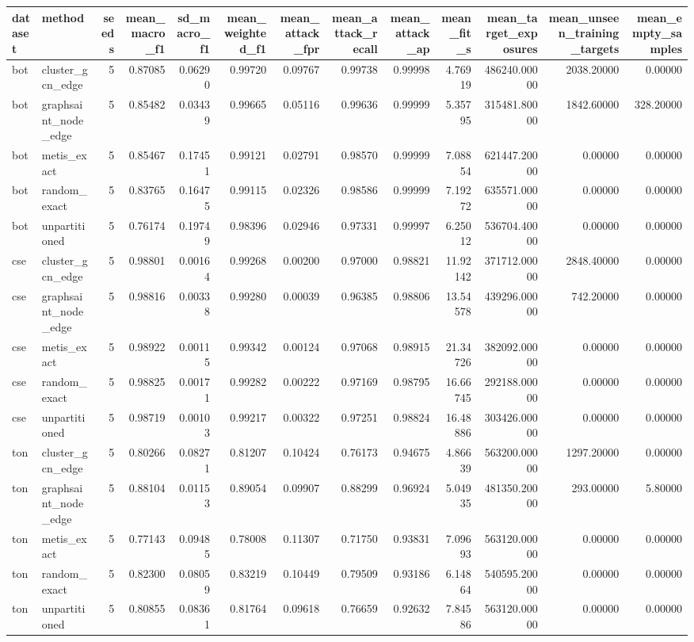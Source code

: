\begin{tabular}{llrrrrrrrrrrr}
\toprule
dataset & method & seeds & mean_macro_f1 & sd_macro_f1 & mean_weighted_f1 & mean_attack_fpr & mean_attack_recall & mean_attack_ap & mean_fit_s & mean_target_exposures & mean_unseen_training_targets & mean_empty_samples \\
\midrule
bot & cluster_gcn_edge & 5 & 0.87085 & 0.06290 & 0.99720 & 0.09767 & 0.99738 & 0.99998 & 4.76919 & 486240.00000 & 2038.20000 & 0.00000 \\
bot & graphsaint_node_edge & 5 & 0.85482 & 0.03439 & 0.99665 & 0.05116 & 0.99636 & 0.99999 & 5.35795 & 315481.80000 & 1842.60000 & 328.20000 \\
bot & metis_exact & 5 & 0.85467 & 0.17451 & 0.99121 & 0.02791 & 0.98570 & 0.99999 & 7.08854 & 621447.20000 & 0.00000 & 0.00000 \\
bot & random_exact & 5 & 0.83765 & 0.16475 & 0.99115 & 0.02326 & 0.98586 & 0.99999 & 7.19272 & 635571.00000 & 0.00000 & 0.00000 \\
bot & unpartitioned & 5 & 0.76174 & 0.19749 & 0.98396 & 0.02946 & 0.97331 & 0.99997 & 6.25012 & 536704.40000 & 0.00000 & 0.00000 \\
cse & cluster_gcn_edge & 5 & 0.98801 & 0.00164 & 0.99268 & 0.00200 & 0.97000 & 0.98821 & 11.92142 & 371712.00000 & 2848.40000 & 0.00000 \\
cse & graphsaint_node_edge & 5 & 0.98816 & 0.00338 & 0.99280 & 0.00039 & 0.96385 & 0.98806 & 13.54578 & 439296.00000 & 742.20000 & 0.00000 \\
cse & metis_exact & 5 & 0.98922 & 0.00115 & 0.99342 & 0.00124 & 0.97068 & 0.98915 & 21.34726 & 382092.00000 & 0.00000 & 0.00000 \\
cse & random_exact & 5 & 0.98825 & 0.00171 & 0.99282 & 0.00222 & 0.97169 & 0.98795 & 16.66745 & 292188.00000 & 0.00000 & 0.00000 \\
cse & unpartitioned & 5 & 0.98719 & 0.00103 & 0.99217 & 0.00322 & 0.97251 & 0.98824 & 16.48886 & 303426.00000 & 0.00000 & 0.00000 \\
ton & cluster_gcn_edge & 5 & 0.80266 & 0.08271 & 0.81207 & 0.10424 & 0.76173 & 0.94675 & 4.86639 & 563200.00000 & 1297.20000 & 0.00000 \\
ton & graphsaint_node_edge & 5 & 0.88104 & 0.01153 & 0.89054 & 0.09907 & 0.88299 & 0.96924 & 5.04935 & 481350.20000 & 293.00000 & 5.80000 \\
ton & metis_exact & 5 & 0.77143 & 0.09485 & 0.78008 & 0.11307 & 0.71750 & 0.93831 & 7.09693 & 563120.00000 & 0.00000 & 0.00000 \\
ton & random_exact & 5 & 0.82300 & 0.08059 & 0.83219 & 0.10449 & 0.79509 & 0.93186 & 6.14864 & 540595.20000 & 0.00000 & 0.00000 \\
ton & unpartitioned & 5 & 0.80855 & 0.08361 & 0.81764 & 0.09618 & 0.76659 & 0.92632 & 7.84586 & 563120.00000 & 0.00000 & 0.00000 \\
\bottomrule
\end{tabular}
